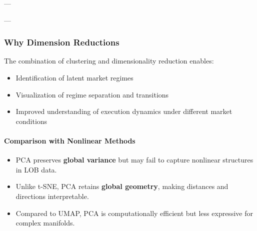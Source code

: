 \documentclass[12pt,a4paper]{report}
\begin{document}
---




---

\subsubsection{Why Dimension Reductions}

The combination of clustering and dimensionality reduction enables:
\begin{itemize}
    \item Identification of latent market regimes
    \item Visualization of regime separation and transitions
    \item Improved understanding of execution dynamics under different market conditions
\end{itemize}

\paragraph{Comparison with Nonlinear Methods}

\begin{itemize}
    \item PCA preserves \textbf{global variance} but may fail to capture nonlinear structures in LOB data.
    \item Unlike t-SNE, PCA retains \textbf{global geometry}, making distances and directions interpretable.
    \item Compared to UMAP, PCA is computationally efficient but less expressive for complex manifolds.
\end{itemize}
\end{document}
